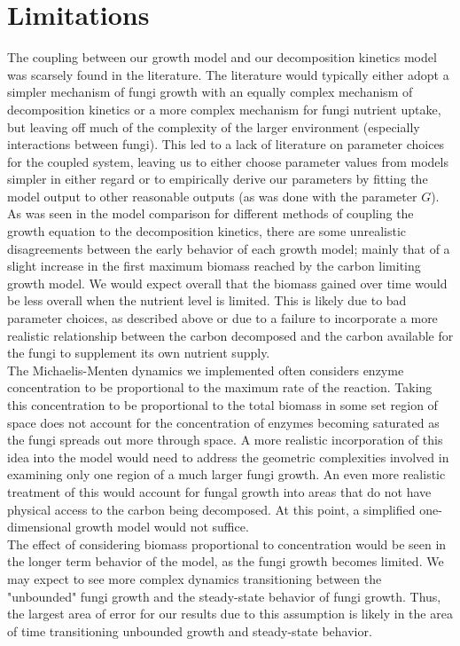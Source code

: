 \documentclass[10pt]{article}
\begin{document}
\section*{Limitations}
The coupling between our growth model and our decomposition kinetics model was scarsely found in the literature. The literature would typically either adopt a simpler mechanism of fungi growth with an equally complex mechanism of decomposition kinetics or a more complex mechanism for fungi nutrient uptake, but leaving off much of the complexity of the larger environment (especially interactions between fungi). This led to a lack of literature on parameter choices for the coupled system, leaving us to either choose parameter values from models simpler in either regard or to empirically derive our parameters by fitting the model output to other reasonable outputs (as was done with the parameter $G$). As was seen in the model comparison for different methods of coupling the growth equation to the decomposition kinetics, there are some unrealistic disagreements between the early behavior of each growth model; mainly that of a slight increase in the first maximum biomass reached by the carbon limiting growth model. We would expect overall that the biomass gained over time would be less overall when the nutrient level is limited. This is likely due to bad parameter choices, as described above or due to a failure to incorporate a more realistic relationship between the carbon decomposed and the carbon available for the fungi to supplement its own nutrient supply. \\
The Michaelis-Menten dynamics we implemented often considers enzyme concentration to be proportional to the maximum rate of the reaction. Taking this concentration to be proportional to the total biomass in some set region of space does not account for the concentration of enzymes becoming saturated as the fungi spreads out more through space. A more realistic incorporation of this idea into the model would need to address the geometric complexities involved in examining only one region of a much larger fungi growth. An even more realistic treatment of this would account for fungal growth into areas that do not have physical access to the carbon being decomposed. At this point, a simplified one-dimensional growth model would not suffice. \\
The effect of considering biomass proportional to concentration would be seen in the longer term behavior of the model, as the fungi growth becomes limited. We may expect to see more complex dynamics transitioning between the "unbounded" fungi growth and the steady-state behavior of fungi growth. Thus, the largest area of error for our results due to this assumption is likely in the area of time transitioning unbounded growth and steady-state behavior. \\
\end{document}
